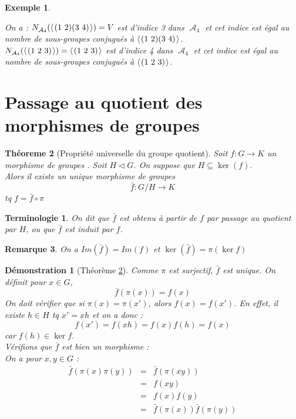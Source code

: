 \documentclass[a4paper, oneside]{report}
\theoremstyle{break}
\newtheorem{thm}{Théoreme}[section] %
\newtheorem{exem}[thm]{Exemple}
\newtheorem{remar}[thm]{Remarque}
\newtheorem*{term}{Terminologie}
\newtheorem*{demo}{Démonstration}
\newcommand{\mdg}{morphisme de groupes }
\newcommand{\mdgs}{morphismes de groupes }
\DeclareMathOperator{\A}{\mathcal{A}}
\newcommand{\pro}[1]{\langle\hspace{0.1em}#1\hspace{0.1em}\rangle}
\newcommand{\gen}{\pro}
\begin{document}
\begin{exem}
\begin{enumerate}
On a :
$ N_{\A_4}(\gen{(1~2)(3~4)})=V$ est d'indice 3 dans $\A_4$ et cet indice est \'egal
au nombre de sous-groupes conjugu\'es \`a $\gen{(1~2)(3~4)}$.\\
$ N_{\A_4}(\gen{(1~2~3)})=\gen{(1~2~3)}$ est d'indice 4 dans $\A_4$ et cet
indice est \'egal au nombre de sous-groupes conjugu\'es \`a $\gen{(1~2~3)}$.
\end{enumerate}
\end{exem}

\section{Passage au quotient des \mdgs}


\begin{thm}[Propriété universelle du groupe quotient]
\label{thm_prop_univ}
Soit $f:G\rightarrow K$ un \mdg. Soit $H\vartriangleleft G$. On suppose que $H\subseteq \ker (f)$.\\
Alors il existe un unique \mdg 
$$\bar{f} : G/H \rightarrow K$$
tq $f=\bar{f}\circ \pi$

\begin{center}
\end{center}

\end{thm}

\begin{term}
On dit que $\bar{f}$ est obtenu à partir de $f$ par passage au quotient par $H$, ou que $\bar{f}$ est induit par $f$.
\end{term}

\begin{remar}
On a $Im(\bar{f})=Im(f)$ et $\ker(\bar{f})=\pi(\ker f)$
\end{remar}

\begin{demo}[Théorème \ref{thm_prop_univ}]
Comme $\pi$ est surjectif, $\bar{f}$ est unique. On définit pour $x\in G$, 
$$\bar{f}(\pi(x))=f(x)$$
On doit vérifier que si $\pi(x)=\pi(x')$, alors $f(x)=f(x')$. En effet, il existe $h\in H$ tq $x'=xh$ et on a donc :
$$f(x')=f(xh)=f(x)f(h)=f(x)$$
car $f(h)\in \ker f$.\\
Vérifions que $\bar{f}$ est bien un morphisme :\\
On a pour $x,y\in G$ :
$$\begin{array}{lll}
\bar{f}(\pi(x)\pi(y))&=&\bar{f}(\pi(xy))\\
&=& f(xy)\\
&=& f(x)f(y)\\
&=& \bar{f}(\pi(x))\bar{f}(\pi(y))
\end{array}$$
~
\end{demo}
\end{document}

